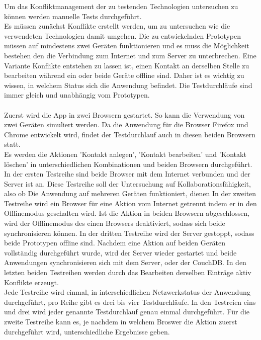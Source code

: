 Um das Konfliktmanagement der zu testenden Technologien untersuchen zu können werden manuelle Tests durchgeführt.\\
Es müssen zunächst Konflikte erstellt werden, um zu untersuchen wie die verwendeten Technologien damit umgehen. Die zu entwickelnden Prototypen müssen auf mindestens zwei Geräten funktionieren und es muss die Möglichkeit bestehen den die Verbindung zum Internet und zum Server zu unterbrechen.
Eine Variante Konflikte entstehen zu lassen ist, einen Kontakt an derselben Stelle zu bearbeiten während ein oder beide Geräte offline sind. Daher ist es wichtig zu wissen, in welchem Status sich die Anwendung befindet.
Die Testdurchläufe sind immer gleich und unabhängig vom Prototypen.\\\\
Zuerst wird die \gls{App} in zwei Browsern gestartet. So kann die Verwendung von zwei Geräten simuliert werden. Da die Anwendung für die Browser Firefox und Chrome entwickelt wird, findet der Testdurchlauf auch in diesen beiden Browsern statt.\\
Es werden die Aktionen 'Kontakt anlegen', 'Kontakt bearbeiten' und 'Kontakt löschen' in unterschiedlichen Kombinationen und beiden Browsern durchgeführt.
In der ersten Testreihe sind beide Browser mit dem Internet verbunden und der Server ist an. Diese Testreihe soll der Untersuchung auf Kollaborationsfähigkeit, also ob Die Anwendung auf mehreren Geräten funktioniert, dienen
In der zweiten Testreihe wird ein Browser für eine Aktion vom Internet getrennt indem er in den Offlinemodus geschalten wird. Ist die Aktion in beiden Browsern abgeschlossen, wird der Offlinemodus des einen Browsers deaktiviert, sodass sich beide synchronisieren können.
In der dritten Testreihe wird der Server gestoppt, sodass beide Prototypen offline sind. Nachdem eine Aktion auf beiden Geräten vollständig durchgeführt wurde, wird der Server wieder gestartet und beide Anwendungen synchronisieren sich mit dem Server, oder der CouchDB. In den letzten beiden Testreihen werden durch das Bearbeiten derselben Einträge aktiv Konflikte erzeugt.\\
Jede Testreihe wird einmal, in interschiedlichen Netzwerkstatus der Anwendung durchgeführt, pro Reihe gibt es drei bis vier Testdurchläufe.
In den Testreien eins und drei wird jeder genannte Testdurchlauf genau einmal durchgeführt.
Für die zweite Testreihe kann es, je nachdem in welchem Broswer die Aktion zuerst durchgeführt wird, unterschiedliche Ergebnisse geben.
